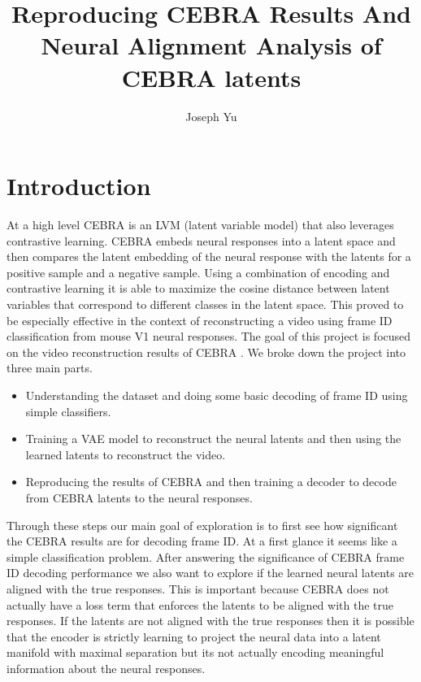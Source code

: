 \documentclass[12pt, letterpaper]{article}
\author{Joseph Yu}
\title{Reproducing CEBRA Results And Neural Alignment Analysis of CEBRA latents}
\begin{document}
\maketitle
\section{Introduction}
\label{sec:introduction}
At a high level CEBRA \cite{schneider2023} is an LVM (latent variable model) that also leverages contrastive learning. CEBRA \cite{schneider2023} embeds neural responses into a latent space and then compares the latent embedding of the neural response with the latents for a positive sample and a negative sample. Using a combination of encoding and contrastive learning it is able to maximize the cosine distance between latent variables that correspond to different classes in the latent space. This proved to be especially effective in the context of reconstructing a video using frame ID classification from mouse V1 neural responses. The goal of this project is focused on the video reconstruction results of CEBRA \cite{schneider2023}. We broke down the project into three main parts. 
\begin{itemize}
    \item Understanding the dataset and doing some basic decoding of frame ID using simple classifiers.
    \item Training a VAE model to reconstruct the neural latents and then using the learned latents to reconstruct the video.
    \item Reproducing the results of CEBRA \cite{schneider2023} and then training a decoder to decode from CEBRA \cite{schneider2023} latents to the neural responses.
\end{itemize}

Through these steps our main goal of exploration is to first see how significant the CEBRA \cite{schneider2023} results are for decoding frame ID. At a first glance it seems like a simple classification problem. After answering the significance of CEBRA \cite{schneider2023} frame ID decoding performance we also want to explore if the learned neural latents are aligned with the true responses. This is important because CEBRA \cite{schneider2023} does not actually have a loss term that enforces the latents to be aligned with the true responses. If the latents are not aligned with the true responses then it is possible that the encoder is strictly learning to project the neural data into a latent manifold with maximal separation but its not actually encoding meaningful information about the neural responses.
\end{document}
